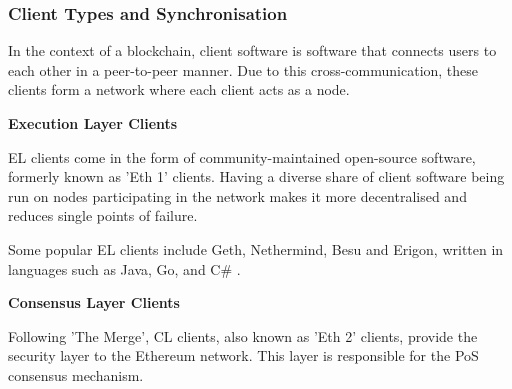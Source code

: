 



\subsubsection{Client Types and Synchronisation}

In the context of a blockchain, client software is software that connects users to each other in a peer-to-peer manner. Due to this cross-communication, these clients form a network where each client acts as a node. 

\textbf{Execution Layer Clients}

EL clients come in the form of community-maintained open-source software, formerly known as 'Eth 1' clients. Having a diverse share of client software being run on nodes participating in the network makes it more decentralised and reduces single points of failure.

Some popular EL clients include Geth, Nethermind, Besu and Erigon, written in languages such as Java, Go, and C\# \cite{EthereumEthereum.org}. 

\textbf{Consensus Layer Clients }

Following 'The Merge', CL clients, also known as 'Eth 2' clients, provide the security layer to the Ethereum network. This layer is responsible for the PoS consensus mechanism.

